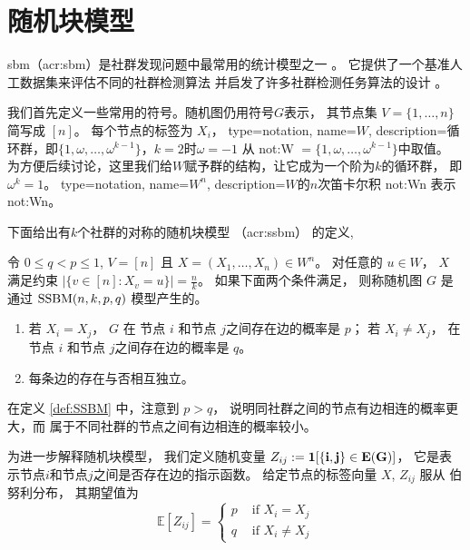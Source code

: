 \section{随机块模型}\label{sec:sbm}
\gls{sbm}（\gls{acr:sbm}）是社群发现问题中最常用的统计模型之一
\cite{holland1983stochastic, abbe2017community}。
它提供了一个基准人工数据集来评估不同的社群检测算法
并启发了许多社群检测任务算法的设计 \cite{fortunato2010community}。

我们首先定义一些常用的符号。随机图仍用符号$G$表示，
其节点集 $V=\{1,\dots, n\}$ 简写成 $[n]$。
每个节点的标签为 $X_i$，
{
  type=notation,
  name={\ensuremath{W}},
  description={循环群，即$\{1, \omega, \dots, \omega^{k-1}\}$，$k=2$时$\omega=-1$}
}
从 \gls{not:W} $= \{1, \omega, \dots, \omega^{k-1}\}$中取值。
为方便后续讨论，这里我们给$W$赋予群的结构，让它成为一个阶为$k$的循环群，
即$\omega^k=1$。
{
  type=notation,
  name={\ensuremath{W^n}},
  description={$W$的$n$次笛卡尔积}
}
\gls{not:Wn} 表示 \glsdesc{not:Wn}。 

下面给出有$k$个社群的对称的随机块模型
（\gls{acr:ssbm}）
的定义, 
	\begin{definition}\label{def:SSBM}
	令 $0\leq q<p\leq 1$, $V=[n]$ 且
  $X=(X_1,\dots,X_n)\in W^n$。 对任意的 $u\in W$，
  $X$ 满足约束
  $|\{v \in [n] : X_v = u\}| = \frac{n}{k}$。
	如果下面两个条件满足，
  则称随机图 $G$ 是通过 $\operatorname{SSBM}(n,k,p,q)$ 模型产生的。 
	\begin{enumerate}
	\item 若 $X_i=X_j$， $G$ 在 节点 $i$ 和节点 $j$之间存在边的概率是 $p$； 
 若 $X_i \neq X_j$，  在 节点 $i$ 和节点 $j$之间存在边的概率是 $q$。
	\item 每条边的存在与否相互独立。
	\end{enumerate}
\end{definition}

在定义 \ref{def:SSBM} 中，注意到 $p>q$，
说明同社群之间的节点有边相连的概率更大，而
属于不同社群的节点之间有边相连的概率较小。

为进一步解释随机块模型，
我们定义随机变量 $Z_{ij}:=\bf{1}[\{i,j\} \in E(G)]$，
它是表示节点$i$和节点$j$之间是否存在边的指示函数。
给定节点的标签向量 $X$, 
$Z_{ij}$ 服从 伯努利分布，
其期望值为
\begin{equation}
\mathbb{E}[Z_{ij}] =
\begin{cases}
p & \textrm{ if } X_i = X_j \\ 
q & \textrm{ if }  X_i \neq X_j
\end{cases}
\end{equation}

